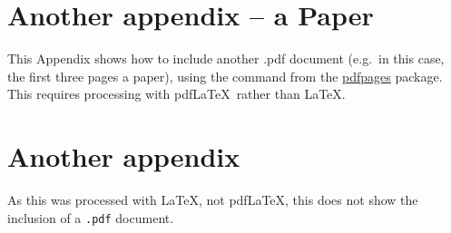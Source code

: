 %
%
\ifpdf

\chapter{Another appendix -- a Paper}

This Appendix shows how to include another .pdf document (e.g.\ in this
case, the first three pages a paper), using the \verb||
command from the \href{http://www.ctan.org/pkg/pdfpages}{pdfpages}
package. This requires processing with pdf\LaTeX\
rather than \LaTeX.

%
%
%

\clearpage





%
%
\else

\chapter{Another appendix}

As this was processed with \LaTeX, not pdf\LaTeX, this does
not show the inclusion of a \verb|.pdf| document.

%
%
\fi

\endinput
